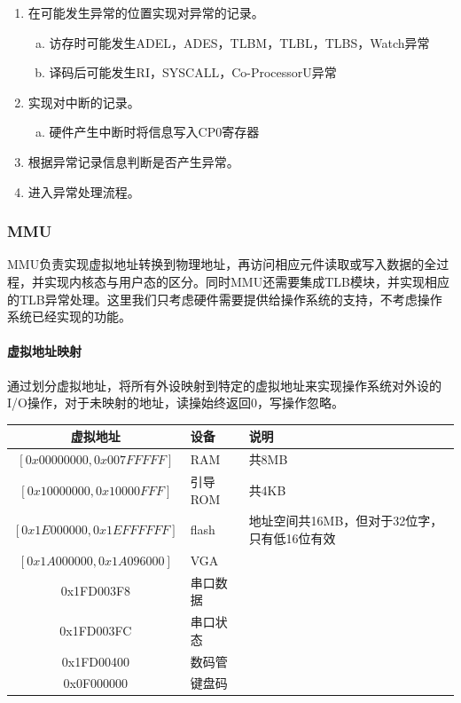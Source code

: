 \begin{enumerate}[(1)]
\item 在可能发生异常的位置实现对异常的记录。

\begin{enumerate}[(a)]
\item 访存时可能发生ADEL，ADES，TLBM，TLBL，TLBS，Watch异常

\item 译码后可能发生RI，SYSCALL，Co-ProcessorU异常
\end{enumerate}
\item 实现对中断的记录。

\begin{enumerate}[(a)]
\item 硬件产生中断时将信息写入CP0寄存器
\end{enumerate}

\item 根据异常记录信息判断是否产生异常。

\item 进入异常处理流程。

\end{enumerate}

\subsubsection{MMU}
MMU负责实现虚拟地址转换到物理地址，再访问相应元件读取或写入数据的全过程，并实现内核态与用户态的区分。同时MMU还需要集成TLB模块，并实现相应的TLB异常处理。这里我们只考虑硬件需要提供给操作系统的支持，不考虑操作系统已经实现的功能。

\paragraph{虚拟地址映射}

\quad

\quad

通过划分虚拟地址，将所有外设映射到特定的虚拟地址来实现操作系统对外设的I/O操作，对于未映射的地址，读操始终返回0，写操作忽略。

\begin{table}[H]
\centering
\begin{tabular}{cll}
\hline
虚拟地址&设备&说明\\
\hline
$\left[ 0x00000000, 0x007FFFFF\right] $&RAM&共8MB\\
$\left[ 0x10000000, 0x10000FFF\right] $&引导ROM&共4KB\\
$\left[ 0x1E000000, 0x1EFFFFFF\right] $&flash&地址空间共16MB，但对于32位字，只有低16位有效\\
$\left[ 0x1A000000, 0x1A096000\right] $&VGA&\\
0x1FD003F8&串口数据&\\
0x1FD003FC&串口状态&\\
0x1FD00400&数码管&\\
0x0F000000&键盘码&\\
\hline
\end{tabular}
\end{table}

